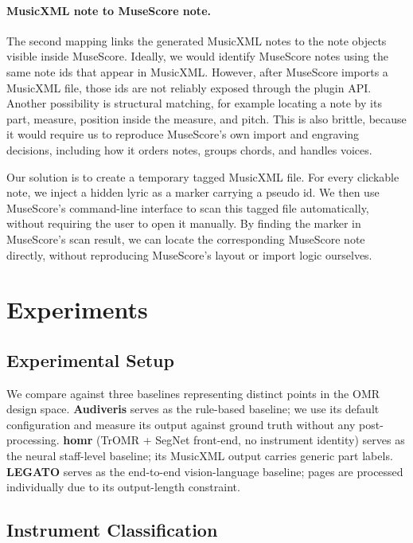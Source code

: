 \documentclass[11pt,a4paper]{article}
\begin{document}
\paragraph{MusicXML note to MuseScore note.}
The second mapping links the generated MusicXML notes to the note objects visible inside MuseScore.
Ideally, we would identify MuseScore notes using the same note ids that appear in MusicXML.
However, after MuseScore imports a MusicXML file, those ids are not reliably exposed through the plugin API.
Another possibility is structural matching, for example locating a note by its part, measure, position inside the measure, and pitch.
This is also brittle, because it would require us to reproduce MuseScore's own import and engraving decisions, including how it orders notes, groups chords, and handles voices.

Our solution is to create a temporary tagged MusicXML file.
For every clickable note, we inject a hidden lyric as a marker carrying a pseudo id.
We then use MuseScore's command-line interface to scan this tagged file automatically, without requiring the user to open it manually.
By finding the marker in MuseScore's scan result, we can locate the corresponding MuseScore note directly, without reproducing MuseScore's layout or import logic ourselves.


\section{Experiments}

\subsection{Experimental Setup}

We compare against three baselines representing distinct points in the OMR design space.
\textbf{Audiveris} serves as the rule-based baseline; we use its default configuration and measure its output against ground truth without any post-processing.
\textbf{homr} (TrOMR + SegNet front-end, no instrument identity) serves as the neural staff-level baseline; its MusicXML output carries generic part labels.
\textbf{LEGATO} serves as the end-to-end vision-language baseline; pages are processed individually due to its output-length constraint.

\subsection{Instrument Classification}
\end{document}
